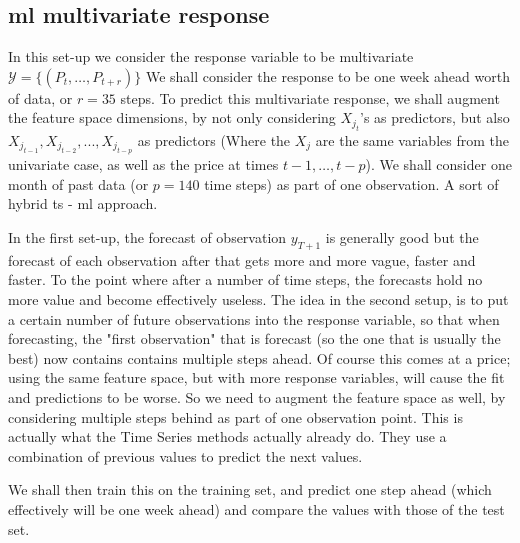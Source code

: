 \subsection{\acrshort{ml} multivariate response}
\sloppy In this set-up we consider the response variable to be multivariate 
$\mathcal{Y}=\{ (P_t,\dots,P_{t+r}) \}$
We shall consider the response to be one week ahead worth of data, or $r=35$ steps. To predict this multivariate response, we shall augment the feature space dimensions, by not only considering $X_{j_t}$'s as predictors, but also $X_{j_{t-1}},X_{j_{t-2}},...,X_{j_{t-p}}$ as predictors (Where the $X_j$ are the same variables from the univariate case, as well as the price at times $t-1, \dots , t-p$). We shall consider one month of past data (or $p=140$ time steps) as part of one observation. A sort of hybrid \acrlong{ts} - \acrlong{ml} approach.

In the first set-up, the forecast of observation $y_{T+1}$ is generally good but the forecast of each observation after that gets more and more vague, faster and faster. To the point where after a number of time steps, the forecasts hold no more value and become effectively useless. The idea in the second setup, is to put a certain number of future observations into the response variable, so that when forecasting, the "first observation" that is forecast (so the one that is usually the best) now contains contains multiple steps ahead. Of course this comes at a price; using the same feature space, but with more response variables, will cause the fit and predictions to be worse. So we need to augment the feature space as well, by considering multiple steps behind as part of one observation point. This is actually what the Time Series methods actually already do. They use a combination of previous values to predict the next values.

We shall then train this on the training set, and predict one step ahead (which effectively will be one week ahead) and compare the values with those of the test set.
